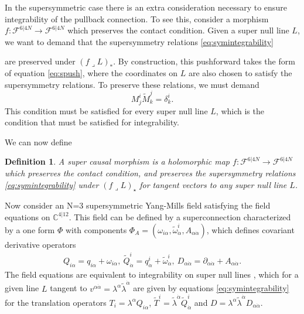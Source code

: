 \documentclass[12pt]{article}
\newcommand{\mbb}{\mathbb}
\newtheorem{mydef}{Definition}
\begin{document}
In the supersymmetric case there is an extra consideration necessary to ensure integrability of the pullback connection. To see this, consider a morphism $f:\mathcal{F}^{6\vert 4N}\rightarrow \mathcal{F}^{6\vert 4N}$ which preserves the contact condition.  Given a super null line $L$, we want to demand that the supersymmetry relations  \eqref{eq:symintegrability}
\begin{comment}\begin{equation}
\{q_{i*}, q_{j*}\}=\{\tilde{q}^i_*,\tilde{q}^j_*\}=0, \ \ \ \{q_{i*}, \tilde{q}^j_*\}=2\delta_i^j \partial_{\sigma*},
\end{equation} \end{comment}
are preserved under $(f\lrcorner L)_*$.  By construction, this pushforward takes the form of equation \eqref{eq:spush}, where the coordinates on $L$ are also chosen to satisfy the supersymmetry relations.  To preserve these relations, we must demand
\begin{equation}
M^i_{j}\tilde{M}_k^{j}=\delta^i_k.
\end{equation}
This condition must be satisfied for every super null line $L$, which is the condition that must be satisfied for integrability.
 
 We can now define
\begin{mydef}
A super causal morphism is a holomorphic map $f:\mathcal{F}^{6\vert 4N}\rightarrow \mathcal{F}^{6\vert 4N}$ which preserves the contact condition, and preserves the supersymmetry relations \eqref{eq:symintegrability} under $(f\lrcorner L)_\star$ for tangent vectors to any super null line $L$.
\end{mydef}

Now consider an N=3 supersymmetric Yang-Mills field satisfying the field equations on $\mbb{C}^{4\vert 12}$.  This field can be defined by a superconnection characterized by a one form $\Phi$ with components $\Phi_A=(\omega_{i\alpha}, \tilde{\omega}^i_{\dot{\alpha}}, A_{\alpha\dot{\alpha}})$, which defines covariant derivative operators 
\begin{align}
Q_{i\alpha}=q_{i\alpha}+\omega_{i\alpha}, \ \tilde{Q}^i_{\dot{\alpha}}=q^i_{\dot{\alpha}}+\tilde{\omega}^i_{\dot{\alpha}}, \ D_{\alpha\dot{\alpha}}=\partial_{\alpha\dot{\alpha}}+A_{\alpha\dot{\alpha}}.
\end{align}
The field equations are equivalent to integrability on super null lines \cite{Harnad1985Constraint}, which for a given line $L$ tangent to $v^{\alpha\dot{\alpha}}=\lambda^{\alpha}\tilde{\lambda}^{\dot{\alpha}}$ are given by equations \eqref{eq:symintegrability} for the translation operators $T_{i}=\lambda^\alpha Q_{i\alpha}$,  $\tilde{T}^i=\tilde{\lambda}^{\dot{\alpha}}\tilde{Q}_{\dot{\alpha}}^{i}$ and $D=\lambda^{\alpha}\tilde{\lambda}^{\dot{\alpha}}D_{\alpha\dot{\alpha}}$.
\end{document}
